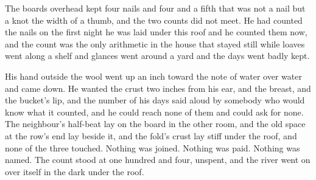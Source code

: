 The boards overhead kept four nails and four and a fifth that was not a nail but a knot the width of a thumb, and the two counts did not meet. He had counted the nails on the first night he was laid under this roof and he counted them now, and the count was the only arithmetic in the house that stayed still while loaves went along a shelf and glances went around a yard and the days went badly kept.

His hand outside the wool went up an inch toward the note of water over water and came down. He wanted the crust two inches from his ear, and the breast, and the bucket's lip, and the number of his days said aloud by somebody who would know what it counted, and he could reach none of them and could ask for none. The neighbour's half-beat lay on the board in the other room, and the old space at the row's end lay beside it, and the fold's crust lay stiff under the roof, and none of the three touched. Nothing was joined. Nothing was paid. Nothing was named. The count stood at one hundred and four, unspent, and the river went on over itself in the dark under the roof.
